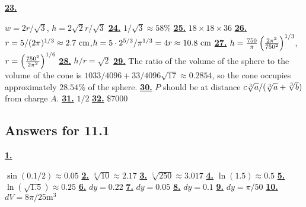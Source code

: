 \hypertarget {a:10.2.23}{\hyperlink {e:10.2.23}{\bfseries 23.}} \mdseries $w=2r/\sqrt 3$, $h=2\sqrt 2r/\sqrt 3$\qquad 
\hypertarget {a:10.2.24}{\hyperlink {e:10.2.24}{\bfseries 24.}} \mdseries $1/\sqrt 3\approx 58\%$\qquad 
\hypertarget {a:10.2.25}{\hyperlink {e:10.2.25}{\bfseries 25.}} \mdseries $18\times 18\times 36$\qquad 
\hypertarget {a:10.2.26}{\hyperlink {e:10.2.26}{\bfseries 26.}} \mdseries $r=5/(2\pi )^{1/3}\approx 2.7\hbox { cm}$,\hfill \break $h=5\cdot 2^{5/3}/\pi ^{1/3}=4r\approx 10.8 \hbox { cm}$\qquad 
\hypertarget {a:10.2.27}{\hyperlink {e:10.2.27}{\bfseries 27.}} \mdseries $h={750\over \pi }\left ({2\pi ^2\over 750^2}\right )^{1/3}$, $r=\left ({750^2\over 2\pi ^2}\right )^{1/6}$\qquad 
\hypertarget {a:10.2.28}{\hyperlink {e:10.2.28}{\bfseries 28.}} \mdseries $h/r=\sqrt 2$\qquad 
\hypertarget {a:10.2.29}{\hyperlink {e:10.2.29}{\bfseries 29.}} \mdseries The ratio of the volume of the sphere to the volume of the cone is $1033/4096+33/4096\sqrt {17}\approx 0.2854$, so the cone occupies approximately $28.54\%$ of the sphere.\qquad 
\hypertarget {a:10.2.30}{\hyperlink {e:10.2.30}{\bfseries 30.}} \mdseries $P$ should be at distance $c\root 3\of {a} / (\root 3\of {a} + \root 3\of {b})$ from charge $A$.\qquad 
\hypertarget {a:10.2.31}{\hyperlink {e:10.2.31}{\bfseries 31.}} \mdseries $1/2$\qquad 
\hypertarget {a:10.2.32}{\hyperlink {e:10.2.32}{\bfseries 32.}} \mdseries \$7000\qquad 
\subsection *{Answers for 11.1}
\hypertarget {a:11.1.1}{\hyperlink {e:11.1.1}{\bfseries 1.}} \mdseries $\sin (0.1/2)\approx 0.05$\qquad 
\hypertarget {a:11.1.2}{\hyperlink {e:11.1.2}{\bfseries 2.}} \mdseries $\sqrt [3]{10}\approx 2.17$\qquad 
\hypertarget {a:11.1.3}{\hyperlink {e:11.1.3}{\bfseries 3.}} \mdseries $\sqrt [5]{250}\approx 3.017$\qquad 
\hypertarget {a:11.1.4}{\hyperlink {e:11.1.4}{\bfseries 4.}} \mdseries $\ln (1.5)\approx 0.5$\qquad 
\hypertarget {a:11.1.5}{\hyperlink {e:11.1.5}{\bfseries 5.}} \mdseries $\ln (\sqrt {1.5})\approx 0.25$\qquad 
\hypertarget {a:11.1.6}{\hyperlink {e:11.1.6}{\bfseries 6.}} \mdseries $dy=0.22$\qquad 
\hypertarget {a:11.1.7}{\hyperlink {e:11.1.7}{\bfseries 7.}} \mdseries $dy=0.05$\qquad 
\hypertarget {a:11.1.8}{\hyperlink {e:11.1.8}{\bfseries 8.}} \mdseries $dy=0.1$\qquad 
\hypertarget {a:11.1.9}{\hyperlink {e:11.1.9}{\bfseries 9.}} \mdseries $dy=\pi /50$\qquad 
\hypertarget {a:11.1.10}{\hyperlink {e:11.1.10}{\bfseries 10.}} \mdseries $dV=8\pi /25 \text {m}^3$\qquad 
